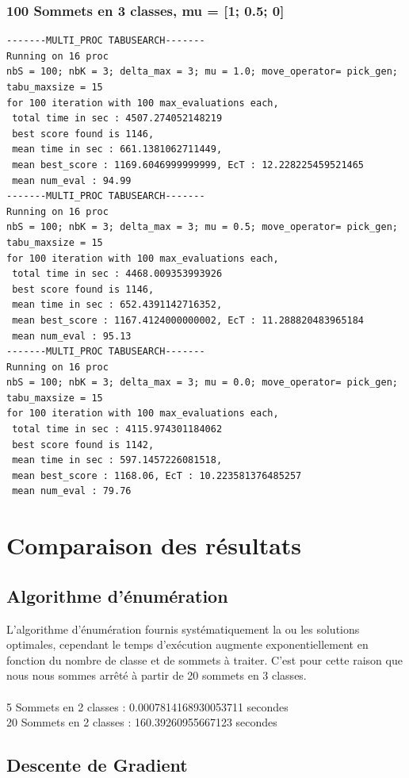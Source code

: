 \documentclass[a4paper]{article}
\begin{document}
\subsubsection{100 Sommets en 3 classes, mu = [1; 0.5; 0]}
\begin{verbatim}
-------MULTI_PROC TABUSEARCH-------
Running on 16 proc
nbS = 100; nbK = 3; delta_max = 3; mu = 1.0; move_operator= pick_gen;
tabu_maxsize = 15
for 100 iteration with 100 max_evaluations each,
 total time in sec : 4507.274052148219
 best score found is 1146,
 mean time in sec : 661.1381062711449,
 mean best_score : 1169.6046999999999, EcT : 12.228225459521465
 mean num_eval : 94.99
-------MULTI_PROC TABUSEARCH-------
Running on 16 proc
nbS = 100; nbK = 3; delta_max = 3; mu = 0.5; move_operator= pick_gen;
tabu_maxsize = 15
for 100 iteration with 100 max_evaluations each,
 total time in sec : 4468.009353993926
 best score found is 1146,
 mean time in sec : 652.4391142716352,
 mean best_score : 1167.4124000000002, EcT : 11.288820483965184
 mean num_eval : 95.13
-------MULTI_PROC TABUSEARCH-------
Running on 16 proc
nbS = 100; nbK = 3; delta_max = 3; mu = 0.0; move_operator= pick_gen;
tabu_maxsize = 15
for 100 iteration with 100 max_evaluations each,
 total time in sec : 4115.974301184062
 best score found is 1142,
 mean time in sec : 597.1457226081518,
 mean best_score : 1168.06, EcT : 10.223581376485257
 mean num_eval : 79.76
\end{verbatim}

\section{Comparaison des résultats}

	\subsection{Algorithme d'énumération}
	L'algorithme d'énumération fournis systématiquement la ou les solutions optimales, cependant le temps d’exécution augmente exponentiellement en fonction du nombre de classe et de sommets à traiter. C'est pour cette raison que nous nous sommes arrêté à partir de 20 sommets en 3 classes.\\\\
	5 Sommets en 2 classes : 0.0007814168930053711 secondes\\
	20 Sommets en 2 classes : 160.39260955667123 secondes

	\subsection{Descente de Gradient}
\end{document}
